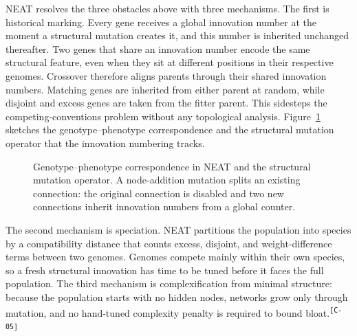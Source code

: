 \documentclass[12pt]{article}
\newcommand{\revID}[1]{\textsuperscript{\scriptsize\texttt{[#1]}}}
\newcommand{\revWeak}[2]{\textcolor{revOrange}{#2}\revID{#1}}
\begin{document}
NEAT resolves the three obstacles above with three mechanisms.
The first is historical marking.
Every gene receives a global innovation number at the moment a structural mutation creates it, and this number is inherited unchanged thereafter.
Two genes that share an innovation number encode the same structural feature, even when they sit at different positions in their respective genomes.
Crossover therefore aligns parents through their shared innovation numbers.
Matching genes are inherited from either parent at random, while disjoint and excess genes are taken from the fitter parent.
This sidesteps the competing-conventions problem without any topological analysis.
Figure~\ref{fig:genotype-phenotype} sketches the genotype--phenotype correspondence and the structural mutation operator that the innovation numbering tracks.

\begin{figure}[h]
\centering
{}
\caption{Genotype--phenotype correspondence in NEAT and the structural mutation operator. A node-addition mutation splits an existing connection: the original connection is disabled and two new connections inherit innovation numbers from a global counter.}
\label{fig:genotype-phenotype}
\end{figure}

The second mechanism is speciation.
NEAT partitions the population into species by a compatibility distance that counts excess, disjoint, and weight-difference terms between two genomes.
Genomes compete mainly within their own species, so a fresh structural innovation has time to be tuned before it faces the full population.
\revWeak{C-05}{The third mechanism is complexification from minimal structure: because the population starts with no hidden nodes, networks grow only through mutation, and no hand-tuned complexity penalty is required to bound bloat.}

\end{document}
